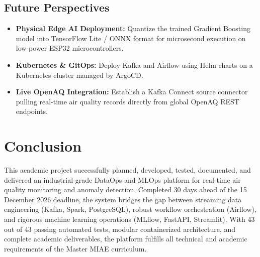 \documentclass[12pt,a4paper]{article}
\begin{document}
\subsection{Future Perspectives}
\begin{itemize}
    \item \textbf{Physical Edge AI Deployment:} Quantize the trained Gradient Boosting model into TensorFlow Lite / ONNX format for microsecond execution on low-power ESP32 microcontrollers.
    \item \textbf{Kubernetes \& GitOps:} Deploy Kafka and Airflow using Helm charts on a Kubernetes cluster managed by ArgoCD.
    \item \textbf{Live OpenAQ Integration:} Establish a Kafka Connect source connector pulling real-time air quality records directly from global OpenAQ REST endpoints.
\end{itemize}

\section{Conclusion}
This academic project successfully planned, developed, tested, documented, and delivered an industrial-grade DataOps and MLOps platform for real-time air quality monitoring and anomaly detection. Completed 30 days ahead of the 15 December 2026 deadline, the system bridges the gap between streaming data engineering (Kafka, Spark, PostgreSQL), robust workflow orchestration (Airflow), and rigorous machine learning operations (MLflow, FastAPI, Streamlit). With 43 out of 43 passing automated tests, modular containerized architecture, and complete academic deliverables, the platform fulfills all technical and academic requirements of the Master MIAE curriculum.
\end{document}
